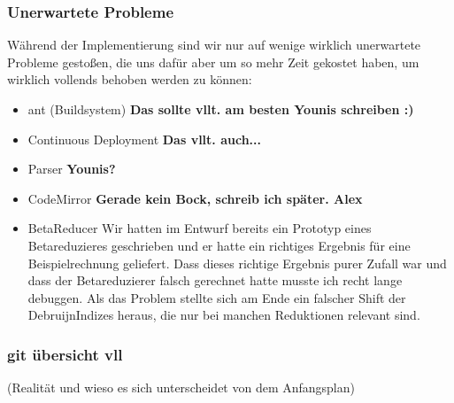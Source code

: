 \documentclass[parskip=full,11pt,twoside]{scrartcl}
\begin{document}
\subsubsection{Unerwartete Probleme}
Während der Implementierung sind wir nur auf wenige wirklich unerwartete Probleme gestoßen, die uns dafür aber um so mehr Zeit gekostet haben, um wirklich vollends behoben werden zu können:
\begin{itemize}
    \item ant (Buildsystem)
        \newline
        \textbf{Das sollte vllt. am besten Younis schreiben :)}
    \item Continuous Deployment
        \newline
        \textbf{Das vllt. auch...}
    \item Parser
        \newline
        \textbf{Younis?}
    \item CodeMirror
        \newline
        \textbf{Gerade kein Bock, schreib ich später. Alex}
    \item BetaReducer
    \newline
    Wir hatten im Entwurf bereits ein Prototyp eines Betareduzieres geschrieben und er hatte ein richtiges Ergebnis für eine Beispielrechnung geliefert. Dass dieses richtige Ergebnis purer Zufall war und dass der Betareduzierer falsch gerechnet hatte musste ich recht lange debuggen. Als das Problem stellte sich am Ende ein falscher Shift der DebruijnIndizes heraus, die nur bei manchen Reduktionen relevant sind.
   
\end{itemize}

\subsubsection{git übersicht vll}
 (Realität und wieso es sich unterscheidet von dem Anfangsplan)
\newpage
\end{document}
